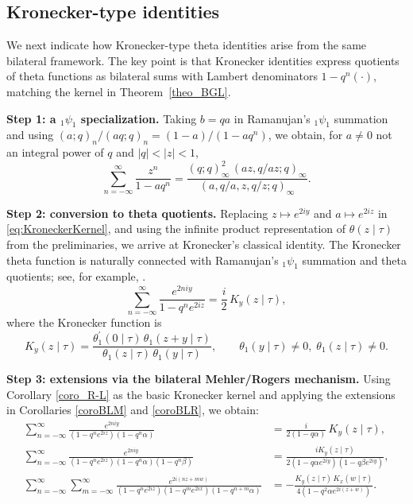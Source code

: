 \documentclass[12pt]{article}
\begin{document}
\subsection{Kronecker-type identities}

We next indicate how Kronecker-type theta identities arise from the same bilateral framework. The key point is that Kronecker identities express quotients of theta functions as bilateral sums with Lambert denominators \(1-q^n(\cdot)\), matching the
kernel in Theorem~\ref{theo_BGL}.

\medskip
\noindent\textbf{Step 1: a \({}_1\psi_1\) specialization.}
Taking \(b=qa\) in Ramanujan's \({}_1\psi_1\) summation and using
\((a;q)_n/(aq;q)_n=(1-a)/(1-aq^n)\), we obtain, for \(a\neq0\) not an integral power
of \(q\) and \(|q|<|z|<1\),
\begin{equation}\label{eq:KroneckerKernel}
\sum_{n=-\infty}^{\infty}\frac{z^n}{1-aq^n}
=
\frac{(q;q)_\infty^2\,(az,q/az;q)_\infty}{(a,q/a,z,q/z;q)_\infty}.
\end{equation}

\medskip
\noindent\textbf{Step 2: conversion to theta quotients.}
Replacing \(z\mapsto e^{2iy}\) and \(a\mapsto e^{2iz}\) in \eqref{eq:KroneckerKernel},
and using the infinite product representation of \(\theta(z\mid \tau)\) from the
preliminaries, we arrive at Kronecker's classical identity. The Kronecker theta function is naturally connected with Ramanujan's
\({}_1\psi_1\) summation and theta quotients; see, for example,
\cite{Kronecker1881,Liu2021Kronecker}.
\begin{equation}\label{eq:KroneckerIdentity}
\sum_{n=-\infty}^{\infty}\frac{e^{2niy}}{1-q^n e^{2iz}}
=
\frac{i}{2}\,K_y(z\mid\tau),
\end{equation}
where the Kronecker function is
\begin{equation}\label{eq:KroneckerFunction}
K_y(z\mid\tau)
=
\frac{\theta_1^{\prime}(0\mid\tau)\,\theta_1(z+y\mid\tau)}
{\theta_1(z\mid\tau)\,\theta_1(y\mid\tau)},
\qquad
\theta_1(y\mid\tau)\neq0,\;\theta_1(z\mid\tau)\neq0.
\end{equation}

\medskip
\noindent\textbf{Step 3: extensions via the bilateral Mehler/Rogers mechanism.}
Using Corollary \ref{coro_R-L} as the basic Kronecker kernel and applying the extensions in Corollaries \ref{coroBLM} and \ref{coroBLR}, we obtain:
\begin{align}
\sum_{n=-\infty}^{\infty}\frac{e^{2niy}}{(1-q^n e^{2iz})(1-q^{n}\alpha)}
&=
\frac{i}{2(1-q\alpha)}\,K_y(z\mid\tau),
\\[2mm]
\sum_{n=-\infty}^{\infty}\frac{e^{2niy}}{(1-q^n e^{2iz})(1-q^n\alpha)(1-q^n\beta)}
&=
\frac{iK_y(z\mid\tau)}{2(1-q\alpha e^{2iy})(1-q\beta e^{2iy})},
\\[2mm]
\sum_{n=-\infty}^{\infty}\sum_{m=-\infty}^{\infty}
\frac{e^{2i(nz+mw)}}{(1-q^n e^{2iz})(1-q^m e^{2ix})(1-q^{n+m}\alpha)}
&=
-\frac{K_y(z\mid\tau)\,K_x(w\mid\tau)}{4(1-q^2\alpha e^{2i(z+w)})}.
\end{align}
\end{document}
